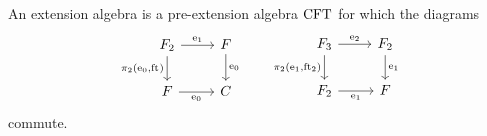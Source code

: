 \begin{defn} 
An extension algebra is a pre-extension algebra $\mathrm{CFT}$ for which 
the diagrams
\begin{equation*}
\begin{tikzcd}
\stesysf_2 
  \ar{d}[swap]{\pullbackpr{2}{\ectxext}{\eft}} 
  \ar{r}{\efamext} 
  & 
\stesysf 
  \ar{d}{\ectxext}
  \\
\stesysf 
  \ar{r}[swap]{\ectxext} 
  & 
\stesysc
\end{tikzcd}
\qquad
\begin{tikzcd}
\stesysf_3
  \ar{d}[swap]{\pullbackpr{2}{\efamext}{\eft[2]}}
  \ar{r}{\eext{2}}
  & 
\stesysf_2 
  \ar{d}{\efamext} 
  \\
\stesysf_2 
  \ar{r}[swap]{\efamext} 
  &
\stesysf
\end{tikzcd}
\end{equation*}
commute.
\end{defn}

\begin{comment}
\begin{lem}
There exists an isomorphism $\alpha$ such that the triangle
\begin{equation*}
\begin{tikzcd}[column sep=tiny]
\pullback{\stesysf}{\stesysf_2}{\ectxext}{\eft\circ\eft[2]}
  \ar[dotted]{rr}{\alpha}
  \ar{dr}[swap]{\pullback{\catid{\stesysf}}{\efamext}{\ectxext}{\eft}}
  &
  &
\stesysf_3
  \ar{dl}{\eext{2}}
  \\
& \stesysf_2
\end{tikzcd}
\end{equation*}
commutes
\end{lem}

\begin{proof}
There is a unique morphism $\alpha:
\pullback{\stesysf}{\stesysf_2}{\ectxext}{\eft\circ\eft[2]}\to\stesysf_3$
rendering the diagram
\begin{equation*}
\begin{tikzcd}[column sep=large]
\pullback{\stesysf}{\stesysf_2}{\ectxext}{\eft\circ\eft[2]}
  \ar[bend left=10,yshift=.5ex]{drrr}{\pullbackpr{2}{\ectxext}{\eft}\circ\pullbackpr{2}{\ectxext}{\eft\circ\eft[2]}}
  \ar[bend right=10]{ddr}[swap]{\pullback{\catid{\stesysf}}{\eft[2]}{\ectxext}{\eft}}
  \ar[dotted]{dr}{\alpha}
  \\
& \stesysf_3
  \ar{r}{\pullbackpr{2}{\efamext}{\eft[2]}}
  \ar{d}{\eft[3]}
  &
\stesysf_2
  \ar{d}[swap]{\eft[2]}
  \ar{r}[swap]{\pullbackpr{2}{\ectxext}{\eft}}
  &
\stesysf
  \ar{d}{\eft}
  \\
{} & \stesysf_2
  \ar{r}[swap]{\efamext}
  &
\stesysf
  \ar{r}[swap]{\ectxext}
  &
\stesysc
\end{tikzcd}
\end{equation*}
\end{proof}
\end{comment}

